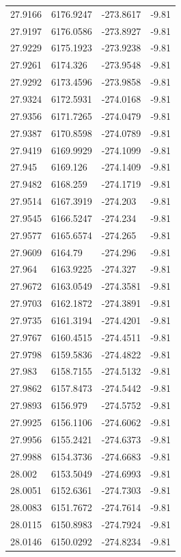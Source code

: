 \begin{table}[H]
\begin{tabular}{llll}
27.9166 & 6176.9247 & -273.8617 & -9.81 \\
27.9197 & 6176.0586 & -273.8927 & -9.81 \\
27.9229 & 6175.1923 & -273.9238 & -9.81 \\
27.9261 & 6174.326 & -273.9548 & -9.81 \\
27.9292 & 6173.4596 & -273.9858 & -9.81 \\
27.9324 & 6172.5931 & -274.0168 & -9.81 \\
27.9356 & 6171.7265 & -274.0479 & -9.81 \\
27.9387 & 6170.8598 & -274.0789 & -9.81 \\
27.9419 & 6169.9929 & -274.1099 & -9.81 \\
27.945 & 6169.126 & -274.1409 & -9.81 \\
27.9482 & 6168.259 & -274.1719 & -9.81 \\
27.9514 & 6167.3919 & -274.203 & -9.81 \\
27.9545 & 6166.5247 & -274.234 & -9.81 \\
27.9577 & 6165.6574 & -274.265 & -9.81 \\
27.9609 & 6164.79 & -274.296 & -9.81 \\
27.964 & 6163.9225 & -274.327 & -9.81 \\
27.9672 & 6163.0549 & -274.3581 & -9.81 \\
27.9703 & 6162.1872 & -274.3891 & -9.81 \\
27.9735 & 6161.3194 & -274.4201 & -9.81 \\
27.9767 & 6160.4515 & -274.4511 & -9.81 \\
27.9798 & 6159.5836 & -274.4822 & -9.81 \\
27.983 & 6158.7155 & -274.5132 & -9.81 \\
27.9862 & 6157.8473 & -274.5442 & -9.81 \\
27.9893 & 6156.979 & -274.5752 & -9.81 \\
27.9925 & 6156.1106 & -274.6062 & -9.81 \\
27.9956 & 6155.2421 & -274.6373 & -9.81 \\
27.9988 & 6154.3736 & -274.6683 & -9.81 \\
28.002 & 6153.5049 & -274.6993 & -9.81 \\
28.0051 & 6152.6361 & -274.7303 & -9.81 \\
28.0083 & 6151.7672 & -274.7614 & -9.81 \\
28.0115 & 6150.8983 & -274.7924 & -9.81 \\
28.0146 & 6150.0292 & -274.8234 & -9.81 \\

\end{tabular}
\end{table}
